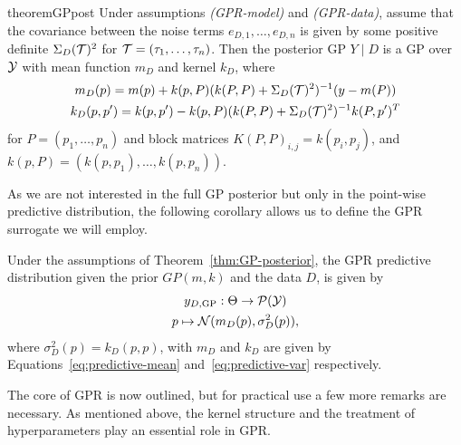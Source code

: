 \begin{restatable}[GP posterior]{theorem}{GPpost} \label{thm:GP-posterior}
    Under assumptions \textit{(GPR-model)} and \textit{(GPR-data)}, assume that the covariance between the noise terms $e_{D,1},\dots,e_{D,n}$ is given by some positive definite $\Sigma_D(\mathcal T)^2$ for $\mathcal T = (\tau_1, \ldots, \tau_n)$. \newline
    Then the posterior GP $Y \mid D$ is a GP over $\mathcal Y$ with mean function $m_D$ and kernel $k_D$, where
    \begin{gather}
        m_D(p) = m(p) + k(p, P) (k(P,P) + \Sigma_D(\mathcal T)^2 )^{-1} (y - m(P)) \label{eq:predictive-mean} \\
        k_D(p, p') = k(p, p') - k(p, P) (k(P,P) + \Sigma_D(\mathcal T)^2 )^{-1} k(P, p')^T \label{eq:predictive-var}
    \end{gather}
    for $P = (p_1, \ldots, p_n)$ and block matrices $K(P,P)_{i,j} = k(p_i, p_j)$, and $k(p, P) = (k(p, p_1), \ldots, k(p, p_n))$.
\end{restatable}

As we are not interested in the full GP posterior but only in the point-wise predictive distribution, the following corollary allows us to define the GPR surrogate we will employ.
\begin{cor}
    Under the assumptions of Theorem~\ref{thm:GP-posterior}, the GPR predictive distribution given the prior $GP(m,k)$ and the data $D$, is given by 
    \begin{gather*}
        y_{D, \text{GP}} : \Theta \rightarrow \mathcal P( \mathcal Y) \\
        p \mapsto \mathcal N( m_D(p), \sigma_D^2(p) ),
    \end{gather*}
    where $ \sigma_D^2(p) = k_D(p,p)$, with $m_D$ and $k_D$ are given by Equations~\eqref{eq:predictive-mean} and~\eqref{eq:predictive-var} respectively.
\end{cor}

The core of GPR is now outlined, but for practical use a few more remarks are necessary.
As mentioned above, the kernel structure and the treatment of hyperparameters play an essential role in GPR.

